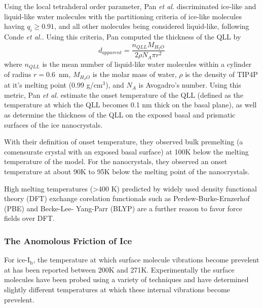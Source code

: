 Using the local tetrahderal order parameter, Pan \textit{et al.}
discriminated ice-like and liquid-like water molecules with the
partitioning criteria of ice-like molecules having $q_{i} \geq 0.91$,
and all other molecules being considered liquid-like, following Conde
\textit{et al.}.\cite{Conde08} Using this criteria, Pan computed the
thickness of the QLL by
\begin{equation}
d_{apparent} = \frac{n_{QLL}M_{H_{2}O}}{2\rho N_{A} \pi r^{2}}
\end{equation}
where $n_{QLL}$ is the mean number of liquid-like water molecules
within a cylinder of radius $r = 0.6$~nm, $M_{H_{2}O}$ is the molar
mass of water, $\rho$ is the density of TIP4P at it's melting point
(0.99 g/cm$^{3}$\cite{Bluhm00,Conde08}), and $N_{A}$ is Avogadro's number.
Using this metric, Pan \textit{et al.} estimate the onset temperature
of the QLL (defined as the temperature at which the QLL becomes 0.1 nm
thick on the basal plane\cite{Conde08}), as well as determine the thickness
of the QLL on the exposed basal and prismatic surfaces of the ice
nanocrystals. 

With their definition of onset temperature, they observed bulk
premelting (a comensurate crystal with an exposed basal surface) at
100K below the melting temperature of the model. For the nanocrystals,
they observed an onset temperature at about 90K to 95K below the
melting point of the nanocrystals. 

High melting temperatures (>400 K) predicted by widely used density
functional theory (DFT) exchange corelation functionals such as
Perdew-Burke-Ernzerhof (PBE)\cite{Perdew96} and Becke-Lee- Yang-Parr
(BLYP)\cite{Becke88,Sprik96} are a further reason to favor force fields over
DFT.\cite{Yoo09}


\subsubsection{The Anomolous Friction of Ice}



For ice-I$_\mathrm{h}$, the temperature at which surface molecule
vibrations become prevelent at has been reported between 200K and
271K. Experimentally the surface molecules have been probed using a
variety of techniques and have determined slightly different
temperatures at which these internal vibrations become prevelent.

